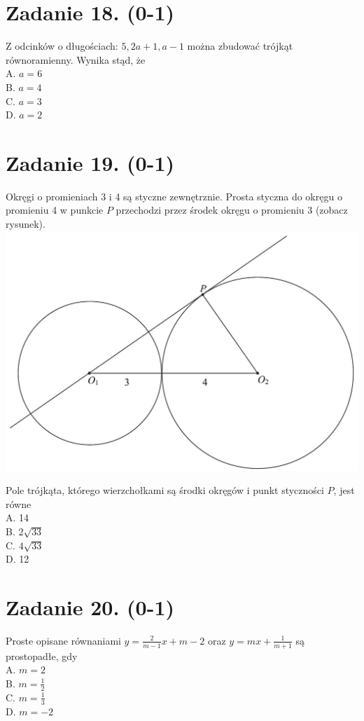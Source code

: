 \documentclass[10pt]{article}
\begin{document}
\section*{Zadanie 18. (0-1)}
Z odcinków o długościach: \(5,2 a+1, a-1\) można zbudować trójkąt równoramienny. Wynika stąd, że\\
A. \(a=6\)\\
B. \(a=4\)\\
C. \(a=3\)\\
D. \(a=2\)

\section*{Zadanie 19. (0-1)}
Okręgi o promieniach 3 i 4 są styczne zewnętrznie. Prosta styczna do okręgu o promieniu 4 w punkcie \(P\) przechodzi przez środek okręgu o promieniu 3 (zobacz rysunek).\\
\includegraphics[max width=\textwidth, center]{2024_11_21_1c92fcc0db78c9202015g-08}

Pole trójkąta, którego wierzchołkami są środki okręgów i punkt styczności \(P\), jest równe\\
A. 14\\
B. \(2 \sqrt{33}\)\\
C. \(4 \sqrt{33}\)\\
D. 12

\section*{Zadanie 20. (0-1)}
Proste opisane równaniami \(y=\frac{2}{m-1} x+m-2\) oraz \(y=m x+\frac{1}{m+1}\) są prostopadłe, gdy\\
A. \(m=2\)\\
B. \(m=\frac{1}{2}\)\\
C. \(m=\frac{1}{3}\)\\
D. \(m=-2\)
\end{document}
